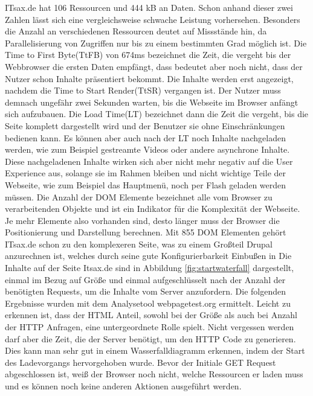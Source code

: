 ITsax.de hat 106 Ressourcen und 444 kB an Daten. Schon anhand dieser zwei Zahlen lässt sich eine vergleichsweise schwache Leistung vorhersehen. Besonders die Anzahl an verschiedenen Ressourcen deutet auf Missstände hin, da Parallelisierung von Zugriffen nur bis zu einem bestimmten Grad möglich ist. Die Time to First Byte(TtFB) von 674ms bezeichnet die Zeit, die vergeht bis der Webbrowser die ersten Daten empfängt, dass bedeutet aber noch nicht, dass der Nutzer schon Inhalte präsentiert bekommt. Die Inhalte werden erst angezeigt, nachdem die Time to Start Render(TtSR) vergangen ist. Der Nutzer muss demnach ungefähr zwei Sekunden warten, bis die Webseite im Browser anfängt sich aufzubauen. Die Load Time(LT) bezeichnet dann die Zeit die vergeht, bis die Seite komplett dargestellt wird und der Benutzer sie ohne Einschränkungen bedienen kann. Es können aber auch nach der LT noch Inhalte nachgeladen werden, wie zum Beispiel gestreamte Videos oder andere asynchrone Inhalte. Diese nachgeladenen Inhalte wirken sich aber nicht mehr negativ auf die User Experience aus, solange sie im Rahmen bleiben und nicht wichtige Teile der Webseite, wie zum Beispiel das Hauptmenü, noch per Flash geladen werden müssen. Die Anzahl der DOM Elemente bezeichnet alle vom Browser zu verarbeitenden Objekte und ist ein Indikator für die Komplexität der Webseite. Je mehr Elemente also vorhanden sind, desto länger muss der Browser die Positionierung und Darstellung berechnen. Mit 855 DOM Elementen gehört ITsax.de schon zu den komplexeren Seite, was zu einem Großteil Drupal anzurechnen ist, welches durch seine gute Konfigurierbarkeit Einbußen in    Die Inhalte auf der Seite Itsax.de sind in Abbildung \ref{fig:startwaterfall} dargestellt, einmal im Bezug auf Größe und einmal aufgeschlüsselt nach der Anzahl der benötigten Requests, um die Inhalte vom Server anzufordern. Die folgenden Ergebnisse wurden mit dem Analysetool webpagetest.org ermittelt. Leicht zu erkennen ist, dass der HTML Anteil, sowohl bei der Größe als auch bei Anzahl der HTTP Anfragen, eine untergeordnete Rolle spielt. Nicht vergessen werden darf aber die Zeit, die der Server benötigt, um den HTTP Code zu generieren. Dies kann man sehr gut in einem Wasserfalldiagramm erkennen, indem der Start des Ladevorgangs hervorgehoben wurde. Bevor der Initiale GET Request abgeschlossen ist, weiß der Browser noch nicht, welche Ressourcen er laden muss und es können noch keine anderen Aktionen ausgeführt werden.
